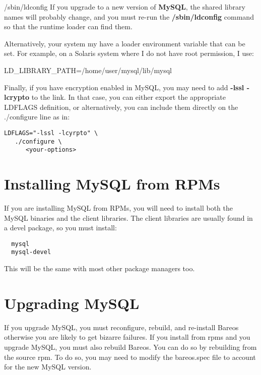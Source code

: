 /sbin/ldconfig If you upgrade to a new version of {\bf MySQL}, the shared
library names will probably change, and you must re-run the {\bf
/sbin/ldconfig} command so that the runtime loader can find them.

Alternatively, your system my have a loader environment variable that can be
set. For example, on a Solaris system where I do not have root permission, I
use:

LD\_LIBRARY\_PATH=/home/user/mysql/lib/mysql

Finally, if you have encryption enabled in MySQL, you may need to add {\bf
-lssl -lcrypto} to the link. In that case, you can either export the
appropriate LDFLAGS definition, or alternatively, you can include them
directly on the ./configure line as in:

\footnotesize
\begin{verbatim}
LDFLAGS="-lssl -lcyrpto" \
   ./configure \
      <your-options>
\end{verbatim}
\normalsize

\section{Installing MySQL from RPMs}
If you are installing MySQL from RPMs, you will need to install
both the MySQL binaries and the client libraries.  The client
libraries are usually found in a devel package, so you must
install:

\footnotesize
\begin{verbatim}
  mysql
  mysql-devel
\end{verbatim}
\normalsize

This will be the same with most other package managers too.

\section{Upgrading MySQL}
\index[general]{Upgrading}
If you upgrade MySQL, you must reconfigure, rebuild, and re-install
Bareos otherwise you are likely to get bizarre failures.  If you
install from rpms and you upgrade MySQL, you must also rebuild Bareos.
You can do so by rebuilding from the source rpm. To do so, you may need
to modify the bareos.spec file to account for the new MySQL version.
